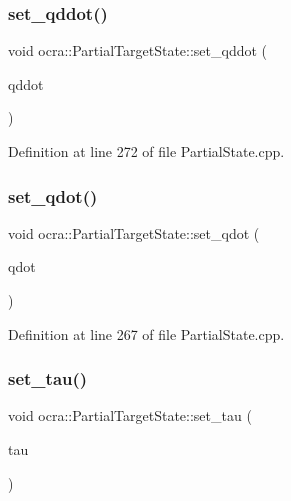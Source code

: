 \subsubsection{\texorpdfstring{set\+\_\+qddot()}{set\_qddot()}}
{\footnotesize\ttfamily void ocra\+::\+Partial\+Target\+State\+::set\+\_\+qddot (\begin{DoxyParamCaption}\item[{const Eigen\+::\+Vector\+Xd \&}]{qddot }\end{DoxyParamCaption})}



Definition at line 272 of file Partial\+State.\+cpp.

\hypertarget{classocra_1_1PartialTargetState_af04d90592c43ee69ed14e212e7fa2f47}{}\label{classocra_1_1PartialTargetState_af04d90592c43ee69ed14e212e7fa2f47} 
\subsubsection{\texorpdfstring{set\+\_\+qdot()}{set\_qdot()}}
{\footnotesize\ttfamily void ocra\+::\+Partial\+Target\+State\+::set\+\_\+qdot (\begin{DoxyParamCaption}\item[{const Eigen\+::\+Vector\+Xd \&}]{qdot }\end{DoxyParamCaption})}



Definition at line 267 of file Partial\+State.\+cpp.

\hypertarget{classocra_1_1PartialTargetState_a3c58ea195fb95e9a5a5e7a00939f955d}{}\label{classocra_1_1PartialTargetState_a3c58ea195fb95e9a5a5e7a00939f955d} 
\subsubsection{\texorpdfstring{set\+\_\+tau()}{set\_tau()}}
{\footnotesize\ttfamily void ocra\+::\+Partial\+Target\+State\+::set\+\_\+tau (\begin{DoxyParamCaption}\item[{const Eigen\+::\+Vector\+Xd \&}]{tau }\end{DoxyParamCaption})}



